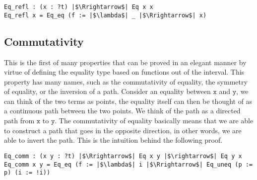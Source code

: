 \documentclass[12pt,twoside,maitrise]{dms}
\theoremstyle{definition}
\numberwithin{equation}{section}
\numberwithin{table}{chapter}
\numberwithin{figure}{chapter}
\newcommand\id[1] {\texttt{#1}}
\begin{document}
\begin{verbatim}
Eq_refl : (x : ?t) |$\Rrightarrow$| Eq x x
Eq_refl x = Eq_eq (f := |$\lambda$| _ |$\Rrightarrow$| x)
\end{verbatim}

\subsection*{Commutativity}
This is the first of many properties that can be proved in an elegant manner by
virtue of defining the equality type based on functions out of the interval.
This property has many names, such as the commutativity of equality, the
symmetry of equality, or the inversion of a path. Consider an equality between
$\id{x}$ and $\id{y}$, we can think of the two terms as points, the equality
itself can then be thought of as a continuous path between the two points. We
think of the path as a directed path from $\id{x}$ to $\id{y}$. The
commutativity of equality basically means that we are able to construct a path
that goes in the opposite direction, in other words, we are able to invert the
path. This is the intuition behind the following proof.

\begin{verbatim}
Eq_comm : (x y : ?t) |$\Rrightarrow$| Eq x y |$\rightarrow$| Eq y x
Eq_comm x y = Eq_eq (f := |$\lambda$| i |$\Rrightarrow$| Eq_uneq (p := p) (i := !i))
\end{verbatim}
\end{document}
